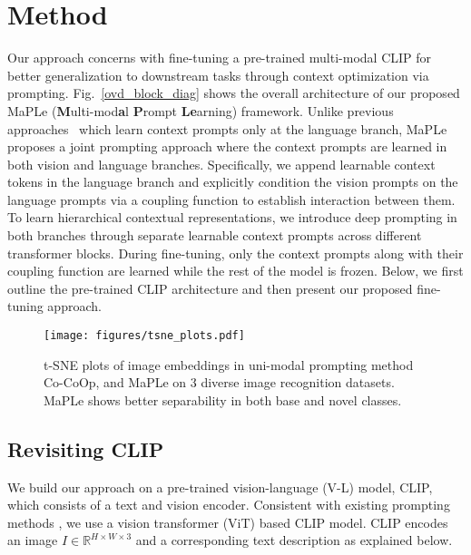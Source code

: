 \documentclass[10pt,twocolumn,letterpaper]{article}
\begin{document}
\section{Method}
\noindent Our approach concerns with fine-tuning a pre-trained multi-modal CLIP for better generalization to downstream tasks through context optimization via prompting. Fig.~\ref{ovd_block_diag} shows the overall architecture of our proposed MaPLe (\textbf{M}ulti-mod\textbf{a}l \textbf{P}rompt \textbf{Le}arning) framework.  Unlike previous approaches~\cite{zhou2022learning, zhou2022conditional} which learn context prompts only at the language branch, MaPLe proposes a joint prompting approach where the context prompts are learned in both vision and language branches. Specifically, we append learnable context tokens in the language branch and explicitly condition the vision prompts on the language prompts via a coupling function to establish interaction between them. To learn hierarchical contextual representations, we introduce deep prompting in both branches through separate learnable context prompts across different transformer blocks. During fine-tuning, only the context prompts along with their coupling function are learned while the rest of the model is frozen.
Below, we first outline the pre-trained CLIP architecture and then present our proposed fine-tuning approach.

\begin{figure*}[h!]
\centering
{\texttt{[image: figures/tsne\_plots.pdf]}}
\caption{\small t-SNE plots of image embeddings in uni-modal prompting method
Co-CoOp,
and MaPLe on 3 diverse image recognition datasets. MaPLe shows better separability in both base and novel classes.}  
\label{fig:tsne_plots}
\end{figure*}




\subsection{Revisiting CLIP}
\noindent We build our approach on a
pre-trained vision-language (V-L) model, CLIP, which consists of a text and vision encoder. Consistent with existing prompting methods \cite{zhou2022learning, zhou2022conditional}, we use a vision transformer (ViT) \cite{dosovitskiy2020image} based CLIP model. CLIP encodes an image $I \in \mathbb{R}^{H\times W \times 3}$ and a corresponding text description as explained below.
\end{document}
